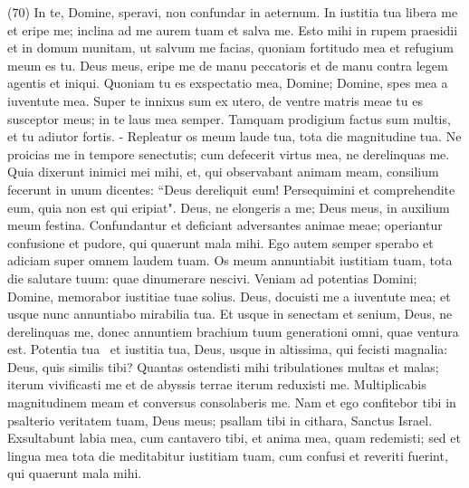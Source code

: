 \begin{biblechapter}  (70) 
\verse In te, Domine, speravi, non confundar in aeternum. 
\verse In iustitia tua libera me et eripe me; inclina ad me aurem tuam et salva me. 
\verse Esto mihi in rupem praesidii et in domum munitam, ut salvum me facias, quoniam fortitudo mea et refugium meum es tu. 
\verse Deus meus, eripe me de manu peccatoris et de manu contra legem agentis et iniqui. 
\verse Quoniam tu es exspectatio mea, Domine; Domine, spes mea a iuventute mea. 
\verse Super te innixus sum ex utero, de ventre matris meae tu es susceptor meus; in te laus mea semper. 
\verse Tamquam prodigium factus sum multis, et tu adiutor fortis. - 
\verse Repleatur os meum laude tua, tota die magnitudine tua. 
\verse Ne proicias me in tempore senectutis; cum defecerit virtus mea, ne derelinquas me. 
\verse Quia dixerunt inimici mei mihi, et, qui observabant animam meam, consilium fecerunt in unum 
\verse dicentes: “Deus dereliquit eum! Persequimini et comprehendite eum, quia non est qui eripiat". 
\verse Deus, ne elongeris a me; Deus meus, in auxilium meum festina. 
\verse Confundantur et deficiant adversantes animae meae; operiantur confusione et pudore, qui quaerunt mala mihi. 
\verse Ego autem semper sperabo et adiciam super omnem laudem tuam. 
\verse Os meum annuntiabit iustitiam tuam, tota die salutare tuum: quae dinumerare nescivi. 
\verse Veniam ad potentias Domini; Domine, memorabor iustitiae tuae solius. 
\verse Deus, docuisti me a iuventute mea; et usque nunc annuntiabo mirabilia tua. 
\verse Et usque in senectam et senium, Deus, ne derelinquas me, donec annuntiem brachium tuum generationi omni, quae ventura est. Potentia tua  
\verse et iustitia tua, Deus, usque in altissima, qui fecisti magnalia: Deus, quis similis tibi? 
\verse Quantas ostendisti mihi tribulationes multas et malas; iterum vivificasti me et de abyssis terrae iterum reduxisti me. 
\verse Multiplicabis magnitudinem meam et conversus consolaberis me. 
\verse Nam et ego confitebor tibi in psalterio veritatem tuam, Deus meus; psallam tibi in cithara, Sanctus Israel. 
\verse Exsultabunt labia mea, cum cantavero tibi, et anima mea, quam redemisti; 
\verse sed et lingua mea tota die meditabitur iustitiam tuam, cum confusi et reveriti fuerint, qui quaerunt mala mihi. 
\end{biblechapter}

